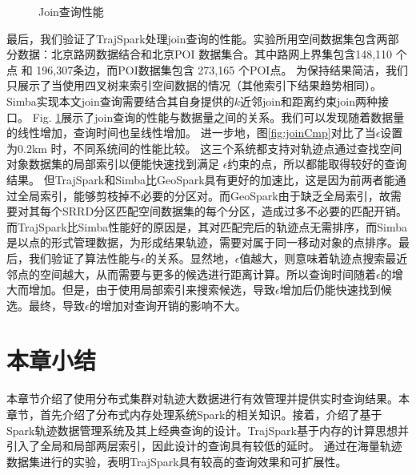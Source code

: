  \begin{figure}
	\centering
	\caption{Join查询性能}
	\label{fig:joinExp}
\end{figure}

最后，我们验证了TrajSpark处理join查询的性能。实验所用空间数据集包含两部分数据：北京路网数据结合\cite{ShangZTCY14}和北京POI 数据集合\cite{ShangZTCY14}。其中路网上界集包含148,110  个点 和 196,307条边，而POI数据集包含 273,165 个POI点。
为保持结果简洁，我们只展示了当使用四叉树来索引空间数据的情况（其他索引下结果趋势相同）。Simba实现本文join查询需要结合其自身提供的$k$近邻join和距离约束join两种接口。
Fig. \ref{fig:joinExp}展示了join查询的性能与数据量之间的关系。我们可以发现随着数据量的线性增加，查询时间也呈线性增加。
进一步地，图\ref{fig:joinCmp}对比了当$\epsilon$设置为0.2km 时，不同系统间的性能比较。
这三个系统都支持对轨迹点通过查找空间对象数据集的局部索引以便能快速找到满足 $\epsilon$约束的点，所以都能取得较好的查询结果。
但TrajSpark和Simba比GeoSpark具有更好的加速比，这是因为前两者能通过全局索引，能够剪枝掉不必要的分区对。而GeoSpark由于缺乏全局索引，故需要对其每个SRRD分区匹配空间数据集的每个分区，造成过多不必要的匹配开销。而TrajSpark比Simba性能好的原因是，其对匹配完后的轨迹点无需排序，而Simba是以点的形式管理数据，为形成结果轨迹，需要对属于同一移动对象的点排序。最后，我们验证了算法性能与$\epsilon$的关系。显然地，$\epsilon$值越大，则意味着轨迹点搜索最近邻点的空间越大，从而需要与更多的候选进行距离计算。所以查询时间随着$\epsilon$的增大而增加。但是，由于使用局部索引来搜索候选，导致$\epsilon$增加后仍能快速找到候选。最终，导致$\epsilon$的增加对查询开销的影响不大。

  
\section{本章小结}\label{sec-c3-conclusion}
本章节介绍了使用分布式集群对轨迹大数据进行有效管理并提供实时查询结果。本章节，首先介绍了分布式内存处理系统Spark的相关知识。接着，介绍了基于Spark轨迹数据管理系统及其上经典查询的设计。TrajSpark基于内存的计算思想并引入了全局和局部两层索引，因此设计的查询具有较低的延时。
通过在海量轨迹数据集进行的实验，表明TrajSpark具有较高的查询效果和可扩展性。

\clearpage
\phantom{s}
\clearpage